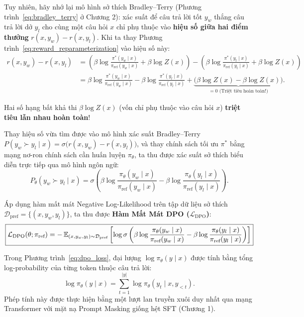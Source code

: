 Tuy nhiên, hãy nhớ lại mô hình sở thích Bradley--Terry (Phương trình~\eqref{eq:bradley_terry} ở Chương 2): xác suất để câu trả lời tốt $y_w$ thắng câu trả lời dở $y_l$ cho cùng một câu hỏi $x$ chỉ phụ thuộc vào \textbf{hiệu số giữa hai điểm thưởng} $r(x, y_w) - r(x, y_l)$. Khi ta thay Phương trình~\eqref{eq:reward_reparameterization} vào hiệu số này:
\begin{align}
    r(x, y_w) - r(x, y_l) &= \left( \beta \log \frac{\pi^*(y_w \mid x)}{\pi_{\text{ref}}(y_w \mid x)} + \beta \log Z(x) \right) - \left( \beta \log \frac{\pi^*(y_l \mid x)}{\pi_{\text{ref}}(y_l \mid x)} + \beta \log Z(x) \right) \nonumber \\
    &= \beta \log \frac{\pi^*(y_w \mid x)}{\pi_{\text{ref}}(y_w \mid x)} - \beta \log \frac{\pi^*(y_l \mid x)}{\pi_{\text{ref}}(y_l \mid x)} + \underbrace{\big(\beta \log Z(x) - \beta \log Z(x)\big)}_{= 0 \text{ (Triệt tiêu hoàn toàn!)}}.
    \label{eq:z_cancellation}
\end{align}

Hai số hạng bất khả thi $\beta \log Z(x)$ (vốn chỉ phụ thuộc vào câu hỏi $x$) \textbf{triệt tiêu lẫn nhau hoàn toàn}!

Thay hiệu số vừa tìm được vào mô hình xác suất Bradley--Terry $P(y_w \succ y_l \mid x) = \sigma\big(r(x, y_w) - r(x, y_l)\big)$, và thay chính sách tối ưu $\pi^*$ bằng mạng nơ-ron chính sách cần huấn luyện $\pi_\theta$, ta thu được xác suất sở thích biểu diễn trực tiếp qua mô hình ngôn ngữ:
\begin{equation}
    P_\theta(y_w \succ y_l \mid x) = \sigma \left( \beta \log \frac{\pi_\theta(y_w \mid x)}{\pi_{\text{ref}}(y_w \mid x)} - \beta \log \frac{\pi_\theta(y_l \mid x)}{\pi_{\text{ref}}(y_l \mid x)} \right).
    \label{eq:dpo_prob}
\end{equation}

Áp dụng hàm mất mát Negative Log-Likelihood trên tập dữ liệu sở thích $\mathcal{D}_{\text{pref}} = \{(x, y_w, y_l)\}$, ta thu được \textbf{Hàm Mất Mát DPO ($\mathcal{L}_{\text{DPO}}$)}:
\begin{equation}
    \boxed{\mathcal{L}_{\text{DPO}}(\theta; \pi_{\text{ref}}) = -\operatorname{\mathbb{E}}_{(x, y_w, y_l) \sim \mathcal{D}_{\text{pref}}} \left[ \log \sigma \left( \beta \log \frac{\pi_\theta(y_w \mid x)}{\pi_{\text{ref}}(y_w \mid x)} - \beta \log \frac{\pi_\theta(y_l \mid x)}{\pi_{\text{ref}}(y_l \mid x)} \right) \right]}
    \label{eq:dpo_loss}
\end{equation}

\begin{remark}
Trong Phương trình~\eqref{eq:dpo_loss}, đại lượng $\log \pi_\theta(y \mid x)$ được tính bằng tổng log-probability của từng token thuộc câu trả lời:
\begin{equation}
    \log \pi_\theta(y \mid x) = \sum_{t=1}^{|y|} \log \pi_\theta(y_t \mid x, y_{<t}).
\end{equation}
Phép tính này được thực hiện bằng một lượt lan truyền xuôi duy nhất qua mạng Transformer với mặt nạ Prompt Masking giống hệt SFT (Chương 1).
\end{remark}

